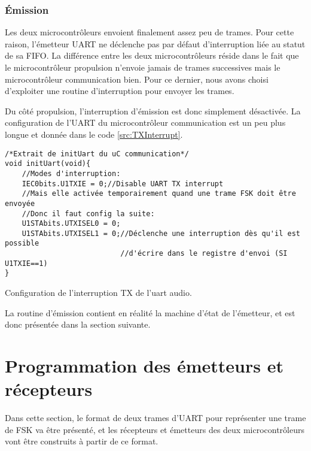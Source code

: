 \subsubsection{\'Emission}
Les deux microcontrôleurs envoient finalement assez peu de trames. Pour cette raison, l'émetteur UART ne déclenche pas par défaut d'interruption liée au statut de sa FIFO. La différence entre les deux microcontrôleurs réside dans le fait que le microcontrôleur propulsion n'envoie jamais de trames successives mais le microcontrôleur communication bien. Pour ce dernier, nous avons choisi d'exploiter une routine d'interruption pour envoyer les trames.

Du côté propulsion, l'interruption d'émission est donc simplement désactivée. La configuration de l'UART du microcontrôleur communication est un peu plus longue et donnée dans le code \ref{src:TXInterrupt}.
\begin{listing}[htbp]
\begin{verbatim}
/*Extrait de initUart du uC communication*/
void initUart(void){
    //Modes d'interruption:
    IEC0bits.U1TXIE = 0;//Disable UART TX interrupt
    //Mais elle activée temporairement quand une trame FSK doit être envoyée
    //Donc il faut config la suite:
    U1STAbits.UTXISEL0 = 0;
    U1STAbits.UTXISEL1 = 0;//Déclenche une interruption dès qu'il est possible
                           //d'écrire dans le registre d'envoi (SI U1TXIE==1)
}
\end{verbatim}
\caption{Configuration de l'interruption TX de l'uart audio.\label{src:TXInterrupt}}
\end{listing}
La routine d'émission contient en réalité la machine d'état de l'émetteur, et est donc présentée dans la section suivante.

\section{Programmation des émetteurs et récepteurs}
Dans cette section, le format de deux trames d'UART pour représenter une trame de FSK va être présenté, et les récepteurs et émetteurs des deux microcontrôleurs vont être construits à partir de ce format.

